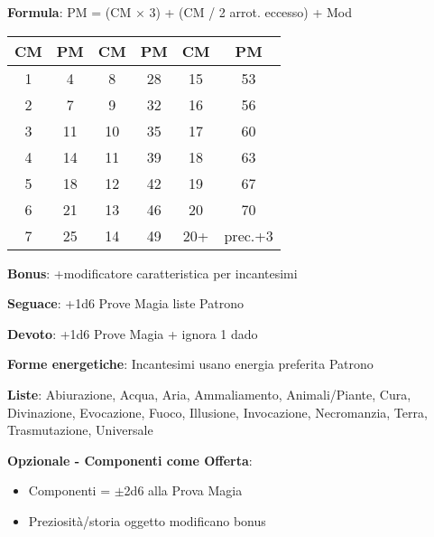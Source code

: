 \documentclass[10pt,a4paper,landscape]{article}
\begin{document}
	\begin{multicols}{2}
		
		\begin{tcolorbox}[title=TABELLA PUNTI MAGIA AGGIORNATA]
			\textbf{Formula}: PM = (CM $\times$ 3) + (CM / 2 arrot. eccesso) + Mod
			
			\begin{tabular}{cc|cc|cc}
				\textbf{CM} & \textbf{PM} & \textbf{CM} & \textbf{PM} & \textbf{CM} & \textbf{PM} \\
				\midrule
				1 & 4 & 8 & 28 & 15 & 53 \\
				2 & 7 & 9 & 32 & 16 & 56 \\
				3 & 11 & 10 & 35 & 17 & 60 \\
				4 & 14 & 11 & 39 & 18 & 63 \\
				5 & 18 & 12 & 42 & 19 & 67 \\
				6 & 21 & 13 & 46 & 20 & 70 \\
				7 & 25 & 14 & 49 & 20+ & prec.+3 \\
			\end{tabular}
			
			\textbf{Bonus}: +modificatore caratteristica per incantesimi
		\end{tcolorbox}
		
		\begin{tcolorbox}[title=LISTE MAGIA PRIVILEGIATE]
			\textbf{Seguace}: +1d6 Prove Magia liste Patrono
			
			\textbf{Devoto}: +1d6 Prove Magia + ignora 1 dado
			
			\textbf{Forme energetiche}: Incantesimi usano energia preferita Patrono
			
			\textbf{Liste}: Abiurazione, Acqua, Aria, Ammaliamento, Animali/Piante, Cura, Divinazione, Evocazione, Fuoco, Illusione, Invocazione, Necromanzia, Terra, Trasmutazione, Universale
			
			\medskip
			
			\textbf{Opzionale - Componenti come Offerta}:
			\begin{itemize}[leftmargin=*,noitemsep]
				\item Componenti = $\pm$2d6 alla Prova Magia
				\item Preziosità/storia oggetto modificano bonus
			\end{itemize}
		\end{tcolorbox}
		
	\end{multicols}
	
\end{document}
